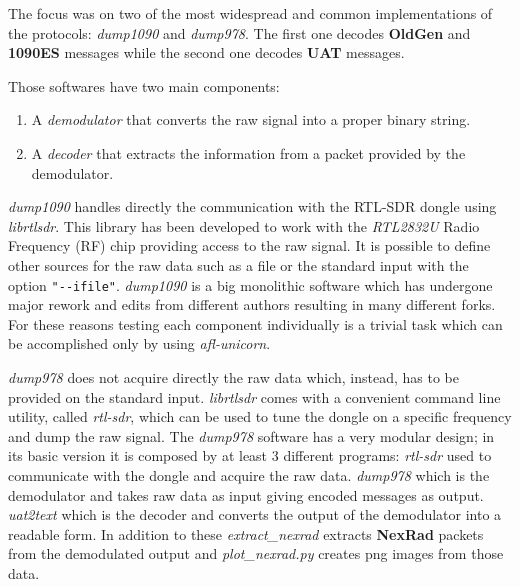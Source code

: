 \documentclass[../main.tex]{subfiles}
\begin{document}
The focus was on two of the most widespread and common implementations of the protocols: \emph{dump1090} and \emph{dump978}. The first one decodes \textbf{OldGen} and \textbf{1090ES} messages while the second one decodes \textbf{UAT} messages.

Those softwares have two main components:
\begin{enumerate}
  \item A \emph{demodulator} that converts the raw signal into a proper binary string.
  \item A \emph{decoder} that extracts the information from a packet provided by the demodulator.
\end{enumerate}

\emph{dump1090} handles directly the communication with the RTL-SDR dongle using
\emph{librtlsdr}. This library has been developed to work with the
\emph{RTL2832U} Radio Frequency (RF) chip providing access to the raw signal. It
is possible to define other sources for the raw data such as a file or the
standard input with the option \texttt{"-{}-ifile"}. \emph{dump1090} is a big
monolithic software which has undergone major rework and edits from different
authors resulting in many different forks. For these reasons testing each
component individually is a trivial task which can be accomplished only by using
\textit{afl-unicorn}.

\emph{dump978} does not acquire directly the raw data which, instead, has to be
provided on the standard input. \textit{librtlsdr} comes with a convenient
command line utility, called \textit{rtl-sdr}, which can be used to tune the
dongle on a specific frequency and dump the raw signal. The \textit{dump978}
software has a very modular design; in its basic version it is composed by at
least 3 different programs: \textit{rtl-sdr} used to communicate with the dongle
and acquire the raw data. \textit{dump978} which is the demodulator and takes
raw data as input giving encoded messages as output. \textit{uat2text} which is
the decoder and converts the output of the demodulator into a readable form. In
addition to these \textit{extract\_nexrad} extracts \textbf{NexRad} packets from
the demodulated output and \textit{plot\_nexrad.py} creates png images from
those data.
\end{document}
